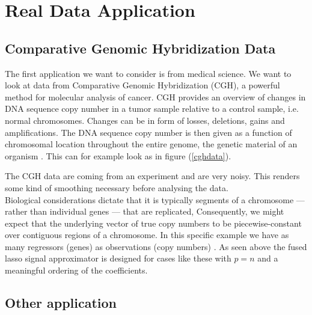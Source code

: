 \documentclass{article}
\theoremstyle{definition}
\begin{document}


\section{Real Data Application}

\subsection{Comparative Genomic Hybridization Data}
The first application we want to consider is from medical science. We want to look at data from Comparative Genomic Hybridization (CGH), a powerful method for molecular analysis of cancer.    
CGH provides an overview of changes in DNA sequence copy number in a tumor sample 
relative to a control sample, i.e. normal chromosomes. Changes can be in form of losses, deletions, gains and amplifications\citep{cghmain}. The DNA  sequence copy number is then given as a function of chromosomal location throughout the entire genome, the genetic material of an organism \citep{cghsecond}. This can for example look as in figure (\ref{cghdata}).

The CGH data are coming from an experiment and are very noisy. This renders some kind of smoothing necessary before analysing the data. \\
Biological considerations dictate that it is typically segments of a chromosome — rather than individual genes — that are replicated, Consequently, we might expect that the underlying vector of true copy numbers to be piecewise-constant over contiguous regions of a chromosome.
In this specific example we have as many regressors (genes) as observations (copy numbers) \citep{sparsity}.
As seen above the fused lasso signal approximator is designed for cases like these with $ p = n$ and a meaningful ordering of the coefficients.

\subsection{Other application}
\end{document}
